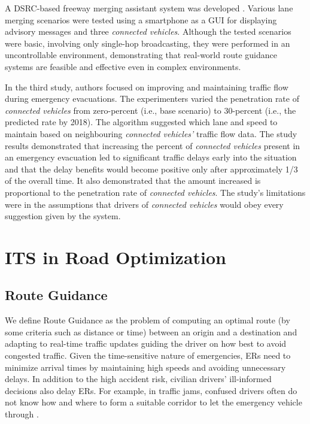 A \acrshort{DSRC}-based freeway merging assistant system was developed \cite{Ahmed2017}. Various lane merging scenarios were tested using a smartphone as a \acrshort{GUI} for displaying advisory messages and three \textit{connected vehicles}. Although the tested scenarios were basic, involving only single-hop broadcasting, they were performed in an uncontrollable environment, demonstrating that real-world route guidance systems are feasible and effective even in complex environments.

In the third study, authors \cite{Bahaaldin2017} focused on improving and maintaining traffic flow during emergency evacuations. The experimenters varied the penetration rate of \textit{connected vehicles} from zero-percent (i.e., base scenario) to 30-percent (i.e., the predicted rate by 2018). The algorithm suggested which lane and speed to maintain based on neighbouring \textit{connected vehicles'} traffic flow data. The study results demonstrated that increasing the percent of \textit{connected vehicles} present in an emergency evacuation led to significant traffic delays early into the situation and that the delay benefits would become positive only after approximately 1/3 of the overall time. It also demonstrated that the amount increased is proportional to the penetration rate of \textit{connected vehicles}. The study's limitations were in the assumptions that drivers of \textit{connected vehicles} would obey every suggestion given by the system.


\section{ITS in Road Optimization}
\subsection{Route Guidance}
We define \gls{Route Guidance} as the problem of computing an optimal route (by some criteria such as distance or time) between an origin and a destination and adapting to real-time traffic updates guiding the driver on how best to avoid congested traffic. Given the time-sensitive nature of emergencies, \acrshort{ER}s need to minimize arrival times by maintaining high speeds and avoiding unnecessary delays. In addition to the high accident risk, civilian drivers' ill-informed decisions also delay \acrshort{ER}s. For example, in traffic jams, confused drivers often do not know how and where to form a suitable corridor to let the emergency vehicle through \cite{Buchenscheit2009}.

